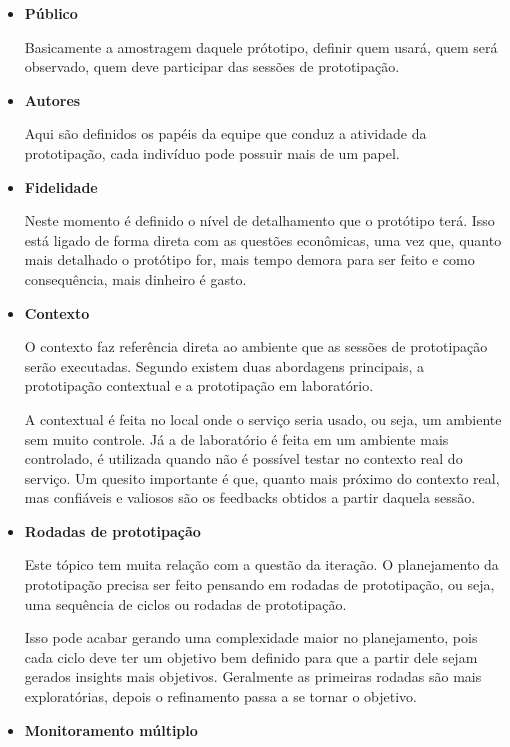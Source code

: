 \begin{itemize}
	\item \textbf{Público}
	
	Basicamente a amostragem daquele prótotipo, definir quem usará, quem será observado, quem deve participar das sessões de prototipação.
	
	\item \textbf{Autores}
	
	Aqui são definidos os papéis da equipe que conduz a atividade da prototipação, cada indivíduo pode possuir mais de um papel.
	
	\item \textbf{Fidelidade}
	
	Neste momento é definido o nível de detalhamento que o protótipo terá. Isso está ligado de forma direta com as questões econômicas, uma vez que, quanto mais detalhado o protótipo for, mais tempo demora para ser feito e como consequência, mais dinheiro é gasto. 
	
	\item \textbf{Contexto}
	
	O contexto faz referência direta ao ambiente que as sessões de prototipação serão executadas. Segundo \cite{Stickdorn2019} existem duas abordagens principais, a prototipação contextual e a prototipação em laboratório.
	
	A contextual é feita no local onde o serviço seria usado, ou seja, um ambiente sem muito controle. Já a de laboratório é feita em um ambiente mais controlado, é utilizada quando não é possível testar no contexto real do serviço. Um quesito importante é que, quanto mais próximo do contexto real, mas confiáveis e valiosos são os feedbacks obtidos a partir daquela sessão.
	
	\item \textbf{Rodadas de prototipação}
	
	Este tópico tem muita relação com a questão da iteração. O planejamento da prototipação precisa ser feito pensando em rodadas de prototipação, ou seja, uma sequência de ciclos ou rodadas de prototipação.
	
	Isso pode acabar gerando uma complexidade maior no planejamento, pois cada ciclo deve ter um objetivo bem definido para que a partir dele sejam gerados insights mais objetivos. Geralmente as primeiras rodadas são mais exploratórias, depois o refinamento passa a se tornar o objetivo.
	
	\item \textbf{Monitoramento múltiplo}
	

\end{itemize}
